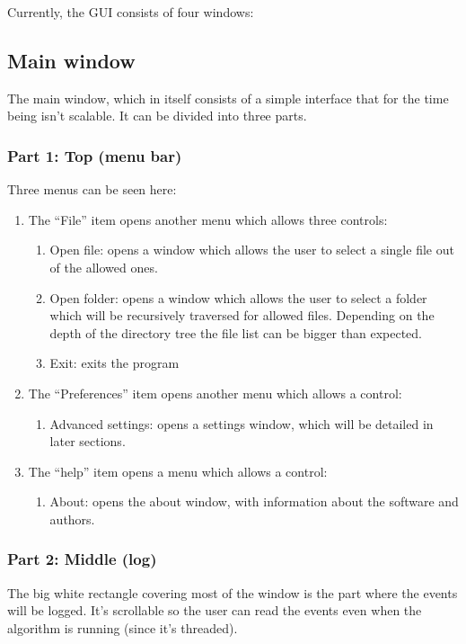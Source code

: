 \documentclass[a4paper,11pt]{memoir}
\begin{document}
Currently, the GUI consists of four windows:

\subsection{Main window}
The main window, which in itself consists of a simple interface that for the time being isn’t scalable. It can be divided into three parts.

\subsubsection{Part 1: Top (menu bar)}
Three menus can be seen here:
\begin{enumerate}
\item The “File” item opens another menu which allows three controls:
\begin{enumerate}
\item Open file: opens a window which allows the user to select a single file out of the allowed ones.
\item Open folder: opens a window which allows the user to select a folder which
will be recursively traversed for allowed files. Depending on the depth of the
directory tree the file list can be bigger than expected.
\item Exit: exits the program
\end{enumerate}
\item The “Preferences” item opens another menu which allows a control:
\begin{enumerate}
\item Advanced settings: opens a settings window, which will be detailed in later
sections.
\end{enumerate}
\item The “help” item opens a menu which allows a control:
\begin{enumerate}
\item About: opens the about window, with information about the software and
authors.
\end{enumerate}
\end{enumerate}

\subsubsection{Part 2: Middle (log)}
The big white rectangle covering most of the window is the part where the events will be logged. It’s scrollable so the user can read the events even when the algorithm is running (since it’s threaded).
\end{document}
